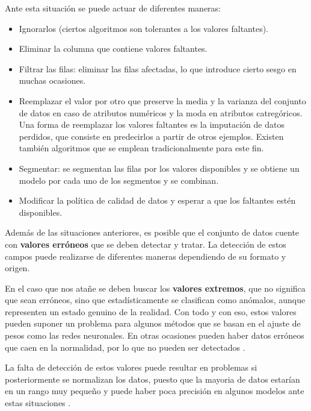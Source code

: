 Ante esta situación se puede actuar de diferentes maneras:
\begin{itemize}
    \item Ignorarlos (ciertos algoritmos son tolerantes a los valores faltantes).
    \item Eliminar la columna que contiene valores faltantes.
    \item Filtrar las filas: eliminar las filas afectadas, lo que introduce cierto sesgo en muchas ocasiones.
    \item Reemplazar el valor por otro que preserve la media y la varianza del conjunto de datos en caso de atributos numéricos y la moda en atributos
        catregóricos.
        Una forma de reemplazar los valores faltantes es la imputación de datos perdidos, que consiste en predecirlos a partir de otros ejemplos. Existen también
        algoritmos que se emplean tradicionalmente para este fin.
    \item Segmentar: se segmentan las filas por los valores disponibles y se obtiene un modelo por cada uno de los segmentos y se combinan.
    \item Modificar la política de calidad de datos y esperar a que los faltantes estén disponibles.
\end{itemize}

Además de las situaciones anteriores, es posible que el conjunto de datos cuente con \textbf{valores erróneos} que 
se deben detectar y tratar.
La detección de estos campos puede realizarse de diferentes maneras dependiendo de su formato y origen.

En el caso que nos atañe se deben buscar los \textbf{valores extremos}, que no significa que sean erróneos, sino que 
estadísticamente se clasifican como anómalos, aunque representen un estado genuino de la realidad.
Con todo y con eso, estos valores pueden suponer un problema para algunos métodos que se basan en el ajuste de pesos
como las redes neuronales.
En otras ocasiones pueden haber datos erróneos que caen en la normalidad, por lo que no pueden ser detectados \cite{book:hernandez2004}.

La falta de detección de estos valores puede resultar en problemas si posteriormente se normalizan los datos, puesto
que la mayoria de datos estarían en un rango muy pequeño y puede haber poca precisión en algunos modelos ante estas situaciones \cite{book:hernandez2004}.

